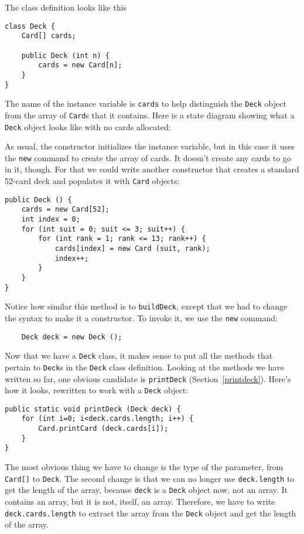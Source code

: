 \documentclass{book}
\newcommand{\beforefig}{\vspace{1.3\parskip}}
\newcommand{\afterfig}{\vspace{-0.2\parskip}}
\newcommand{\myfig}[1]{
    \beforefig
    \centerline{\epsfig{#1,scale=0.8}}
    \afterfig
}
\begin{document}

The class definition looks like this

\begin{verbatim}
class Deck {
    Card[] cards;

    public Deck (int n) {
        cards = new Card[n];
    }
}
\end{verbatim}
%
The name of the instance variable is {\tt cards} to help
distinguish the {\tt Deck} object from the array of {\tt Card}s
that it contains.  Here is a state diagram showing what a
{\tt Deck} object looks like with no cards allocated:


\myfig{figure=figs/deckobject.eps}

As usual, the constructor initializes the instance variable, but in
this case it uses the {\tt new} command to create the array of cards.
It doesn't create any cards to go in it, though.  For that we could
write another constructor that creates a standard 52-card deck and
populates it with {\tt Card} objects:

\begin{verbatim}
public Deck () {
    cards = new Card[52];
    int index = 0;
    for (int suit = 0; suit <= 3; suit++) {
        for (int rank = 1; rank <= 13; rank++) {
            cards[index] = new Card (suit, rank);
            index++;
        }
    }
}
\end{verbatim}

Notice how similar this method is to {\tt buildDeck}, except
that we had to change the syntax to make it a constructor.
To invoke it, we use the {\tt new} command:


\begin{verbatim}
    Deck deck = new Deck ();
\end{verbatim}
%
Now that we have a {\tt Deck} class, it makes sense to put
all the methods that pertain to {\tt Deck}s in the {\tt Deck}
class definition.  Looking at the methods we have written so
far, one obvious candidate is {\tt printDeck} (Section~\ref{printdeck}).
Here's how it looks, rewritten to work with a {\tt Deck}
object:


\begin{verbatim}
public static void printDeck (Deck deck) {
    for (int i=0; i<deck.cards.length; i++) {
        Card.printCard (deck.cards[i]);
    }
}
\end{verbatim}
%
The most obvious thing we have to change is the type of the parameter,
from {\tt Card[]} to {\tt Deck}.  The second change is that we can no
longer use {\tt deck.length} to get the length of the array, because
{\tt deck} is a {\tt Deck} object now, not an array.  It contains an
array, but it is not, itself, an array.  Therefore, we have to write
{\tt deck.cards.length} to extract the array from the {\tt Deck}
object and get the length of the array.
\end{document}
